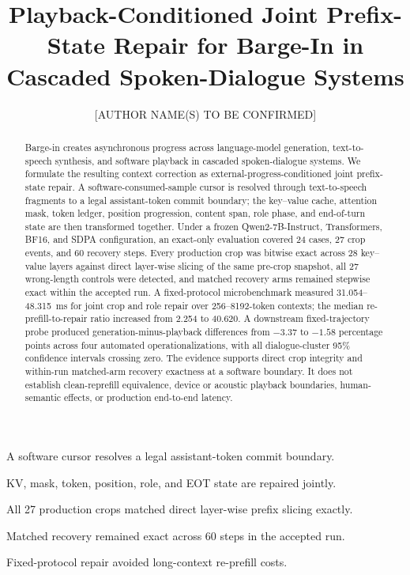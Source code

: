 \documentclass[preprint,12pt,authoryear]{elsarticle}
\begin{document}
\hypersetup{pageanchor=false}

\begin{frontmatter}

\title{Playback-Conditioned Joint Prefix-State Repair for Barge-In in Cascaded Spoken-Dialogue Systems}

\author[aff1]{[AUTHOR NAME(S) TO BE CONFIRMED]}

\begin{abstract}
Barge-in creates asynchronous progress across language-model generation, text-to-speech synthesis, and software playback in cascaded spoken-dialogue systems. We formulate the resulting context correction as external-progress-conditioned joint prefix-state repair. A software-consumed-sample cursor is resolved through text-to-speech fragments to a legal assistant-token commit boundary; the key--value cache, attention mask, token ledger, position progression, content span, role phase, and end-of-turn state are then transformed together. Under a frozen Qwen2-7B-Instruct, Transformers, BF16, and SDPA configuration, an exact-only evaluation covered 24 cases, 27 crop events, and 60 recovery steps. Every production crop was bitwise exact across 28 key--value layers against direct layer-wise slicing of the same pre-crop snapshot, all 27 wrong-length controls were detected, and matched recovery arms remained stepwise exact within the accepted run. A fixed-protocol microbenchmark measured 31.054--48.315~ms for joint crop and role repair over 256--8192-token contexts; the median re-prefill-to-repair ratio increased from 2.254 to 40.620. A downstream fixed-trajectory probe produced generation-minus-playback differences from $-3.37$ to $-1.58$ percentage points across four automated operationalizations, with all dialogue-cluster 95\% confidence intervals crossing zero. The evidence supports direct crop integrity and within-run matched-arm recovery exactness at a software boundary. It does not establish clean-reprefill equivalence, device or acoustic playback boundaries, human-semantic effects, or production end-to-end latency.
\end{abstract}

\begin{highlights}
\item A software cursor resolves a legal assistant-token commit boundary.
\item KV, mask, token, position, role, and EOT state are repaired jointly.
\item All 27 production crops matched direct layer-wise prefix slicing exactly.
\item Matched recovery remained exact across 60 steps in the accepted run.
\item Fixed-protocol repair avoided long-context re-prefill costs.
\end{highlights}


\end{frontmatter}
\end{document}
